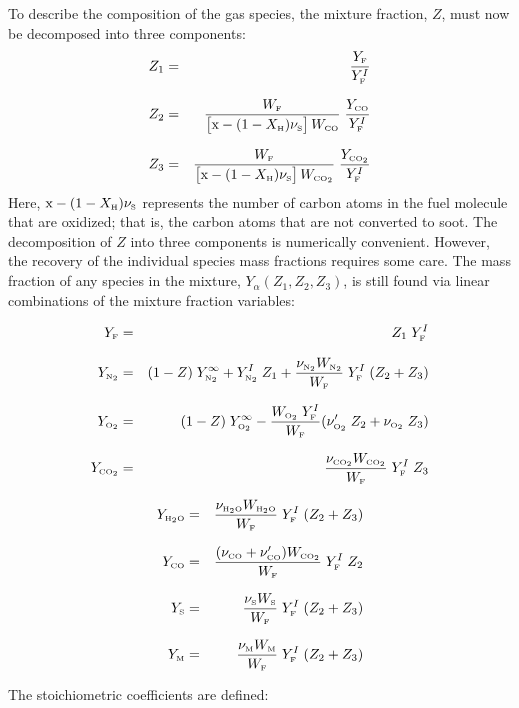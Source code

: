 \documentclass[11pt]{book}
\begin{document}
To describe the composition of the gas species, the mixture fraction, $Z$, must now be decomposed into three components:
\begin{eqnarray}  Z_1 &=& \frac{Y_{\tiny \hbox{F}}}{Y_{\tiny \hbox{F}}^I}   \\*[.1in]
                  Z_2 &=& \frac{W_{\tiny \hbox{F}}}{\big[\hbox{x}-(1-X_{\tiny \hbox{H}}) \nu_{\tiny \hbox{S}} \big] \, W_{\tiny \hbox{CO}} }    \;  \frac{Y_{\tiny \hbox{CO}}}{Y_{\tiny \hbox{F}}^I} \\*[.1in]
                  Z_3 &=& \frac{W_{\tiny \hbox{F}}}{\big[\hbox{x}-(1-X_{\tiny \hbox{H}}) \nu_{\tiny \hbox{S}} \big] \, W_{\tiny \hbox{CO}_2} } \;  \frac{Y_{\tiny \hbox{CO}_2}}{Y_{\tiny \hbox{F}}^I}  \end{eqnarray}
Here, $\hbox{x}-(1-X_{\tiny \hbox{H}}) \nu_{\tiny \hbox{S}}$ represents the number of carbon atoms in the fuel molecule that are oxidized; that is, the carbon atoms that are not converted to soot.
The decomposition of $Z$ into three components is numerically convenient. However, the recovery of the
individual species mass fractions requires some care.  The mass fraction of any species in the mixture,
$Y_\alpha(Z_1,Z_2,Z_3)$, is still found via linear combinations of the mixture fraction variables:

\parbox{2.5in}{
\begin{eqnarray*}  Y_{\tiny \hbox{F}}    &=& Z_1 \; Y_{\tiny \hbox{F}}^I   \\*[.1in]
                  Y_{\tiny \hbox{N}_2}  &=& (1 - Z) \; Y_{\tiny \hbox{N}_2}^\infty  + Y_{\tiny \hbox{N}_2}^I \; Z_1 + \frac{\nu_{\tiny \hbox{N}_2} W_{\tiny \hbox{N}_2}}{W_{\tiny \hbox{F}}} \; Y_{\tiny \hbox{F}}^I \; (Z_2+Z_3)  \\*[.1in]
                  Y_{\tiny \hbox{O}_2}  &=& (1 - Z) \; Y_{\tiny \hbox{O}_2}^\infty  - \frac{W_{\tiny \hbox{O}_2} \; Y_{\tiny \hbox{F}}^I}{W_{\tiny \hbox{F}}} (\nu_{\tiny \hbox{O}_2}'  \; Z_2 +\nu_{\tiny \hbox{O}_2}  \; Z_3) \\*[.1in]
                  Y_{\tiny \hbox{CO}_2} &=& \frac{\nu_{\tiny \hbox{CO}_2} W_{\tiny \hbox{CO}_2}}{W_{\tiny \hbox{F}}} \; Y_{\tiny \hbox{F}}^I \; Z_3 \end{eqnarray*} }
\hfill \parbox{3.5in}{\begin{eqnarray}
                  Y_{\tiny \hbox{H}_2\hbox{O}} &=& \frac{\nu_{\tiny \hbox{H}_2\hbox{O}} W_{\tiny \hbox{H}_2\hbox{O}}}{W_{\tiny \hbox{F}}} \; Y_{\tiny \hbox{F}}^I \; (Z_2 + Z_3) \\*[.1in]
                  Y_{\tiny \hbox{CO}}    &=& \frac{(\nu_{\tiny \hbox{CO}}+\nu_{\tiny \hbox{CO}}') W_{\tiny \hbox{CO}_2}}{W_{\tiny \hbox{F}}} \; Y_{\tiny \hbox{F}}^I \; Z_2 \\*[.1in]
                  Y_{\tiny \hbox{S}}    &=& \frac{\nu_{\tiny \hbox{S}} W_{\tiny \hbox{S}}}{W_{\tiny \hbox{F}}} \; Y_{\tiny \hbox{F}}^I \; (Z_2 + Z_3) \\*[.1in]
                  Y_{\tiny \hbox{M}}     &=& \frac{\nu_{\tiny \hbox{M}} W_{\tiny \hbox{M}}}{W_{\tiny \hbox{F}}} \; Y_{\tiny \hbox{F}}^I \; (Z_2 + Z_3)
\end{eqnarray} }
The stoichiometric coefficients are defined:
\end{document}
